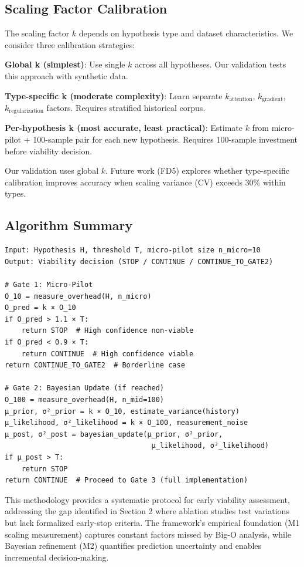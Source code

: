\subsection{Scaling Factor Calibration}

The scaling factor $k$ depends on hypothesis type and dataset characteristics. We consider three calibration strategies:

\textbf{Global k (simplest)}: Use single $k$ across all hypotheses. Our validation tests this approach with synthetic data.

\textbf{Type-specific k (moderate complexity)}: Learn separate $k_{\text{attention}}$, $k_{\text{gradient}}$, $k_{\text{regularization}}$ factors. Requires stratified historical corpus.

\textbf{Per-hypothesis k (most accurate, least practical)}: Estimate $k$ from micro-pilot + 100-sample pair for each new hypothesis. Requires 100-sample investment before viability decision.

Our validation uses global $k$. Future work (FD5) explores whether type-specific calibration improves accuracy when scaling variance (CV) exceeds 30\% within types.

\subsection{Algorithm Summary}

\begin{verbatim}
Input: Hypothesis H, threshold T, micro-pilot size n_micro=10
Output: Viability decision (STOP / CONTINUE / CONTINUE_TO_GATE2)

# Gate 1: Micro-Pilot
O_10 = measure_overhead(H, n_micro)
O_pred = k × O_10
if O_pred > 1.1 × T:
    return STOP  # High confidence non-viable
if O_pred < 0.9 × T:
    return CONTINUE  # High confidence viable
return CONTINUE_TO_GATE2  # Borderline case

# Gate 2: Bayesian Update (if reached)
O_100 = measure_overhead(H, n_mid=100)
μ_prior, σ²_prior = k × O_10, estimate_variance(history)
μ_likelihood, σ²_likelihood = k × O_100, measurement_noise
μ_post, σ²_post = bayesian_update(μ_prior, σ²_prior,
                                   μ_likelihood, σ²_likelihood)
if μ_post > T:
    return STOP
return CONTINUE  # Proceed to Gate 3 (full implementation)
\end{verbatim}

This methodology provides a systematic protocol for early viability assessment, addressing the gap identified in Section 2 where ablation studies test variations but lack formalized early-stop criteria. The framework's empirical foundation (M1 scaling measurement) captures constant factors missed by Big-O analysis, while Bayesian refinement (M2) quantifies prediction uncertainty and enables incremental decision-making.
